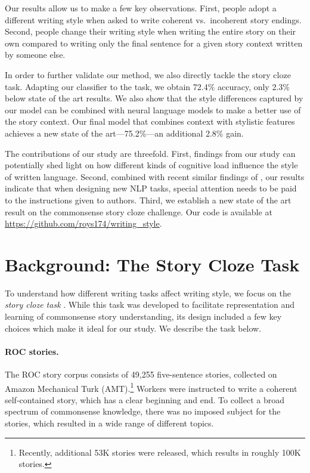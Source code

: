 \documentclass[11pt,a4paper]{article}
\newcommand{\isection}[2]{\section{#1}\label{ssec:#2}}
\begin{document}
Our results allow us to make a few key observations.
First, people adopt a different writing style when asked to write coherent vs.~incoherent story endings.
Second,  people change their writing style when writing the entire story on their own compared to 
writing only the final sentence for a given story context written by someone else.


In order to further validate our method, we also directly tackle the
story cloze task. 
Adapting our classifier to the task, we obtain 72.4\% accuracy, only 2.3\% below state of the art results.
We also show that the style differences captured by our model can be combined with neural language models to make a better use of the story context. 
Our final model that combines context with stylistic features achieves
a new state of the art---75.2\%---an additional 2.8\% gain.

The contributions of our study are threefold. 
First, findings from our study can potentially shed light on 
how different kinds of cognitive load influence the style of written language. 
Second, combined with recent similar findings of \citet{Cai:2017}, our results indicate that when designing new NLP tasks, special attention needs to be paid to the instructions given to authors.
Third, we establish a new state of the art result on the commonsense story cloze challenge. 
Our code is available at \url{https://github.com/roys174/writing_style}.

\isection{Background: The Story Cloze Task}{ROC_Story}
To understand how different writing tasks affect writing style, 
we focus on the \textit{story cloze task} \cite{Mostafazadeh:2016}. 
While this task was developed to facilitate representation and learning of commonsense story understanding,
its design included a few key choices which  make it ideal for our study. 
We describe the task below.




\paragraph{ROC stories.}

The ROC story corpus consists of 49,255 five-sentence 
stories, collected on Amazon Mechanical Turk (AMT).\footnote{Recently,
  additional 53K stories were released, which results in roughly
  100K stories.}
Workers were instructed to write a coherent self-contained story, which has a clear beginning and end. 
To collect a broad spectrum of commonsense knowledge, there was no imposed subject for the stories,
which resulted in a wide range of different topics.
\end{document}
